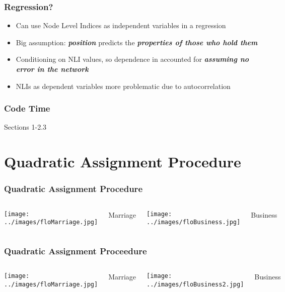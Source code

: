 \documentclass{beamer}
\begin{document}
\begin{frame}
\frametitle{Regression?}
\begin{itemize}
\pause
\item Can use Node Level Indices as independent variables in a regression
\pause
\item Big assumption: \textit{\textbf{position}} predicts the \textit{\textbf{properties of those who hold them}}
\pause
\item Conditioning on NLI values, so dependence in accounted for \textit{\textbf{assuming no error in the network}}
\pause
\item NLIs as dependent variables more problematic due to autocorrelation
\end{itemize}
\end{frame}
\begin{frame}
\frametitle{Code Time}
Sections 1-2.3
\end{frame}


\section{Quadratic Assignment Procedure}
\begin{frame}
\frametitle{Quadratic Assignment Procedure}

\begin{columns}
\column{5.5cm} %
\texttt{[image: ../images/floMarriage.jpg]}
\begin{center}
Marriage
\end{center}
\column{6cm} %
\texttt{[image: ../images/floBusiness.jpg]}
\begin{center}
Business
\end{center}
\end{columns}
\end{frame}

\begin{frame}
\frametitle{Quadratic Assignment Proceedure}

\begin{columns}
\column{5.5cm} %
\texttt{[image: ../images/floMarriage.jpg]}
\begin{center}
Marriage
\end{center}
\column{6cm} %
\texttt{[image: ../images/floBusiness2.jpg]}
\begin{center}
Business
\end{center}
\end{columns}
\end{frame}
\end{document}
